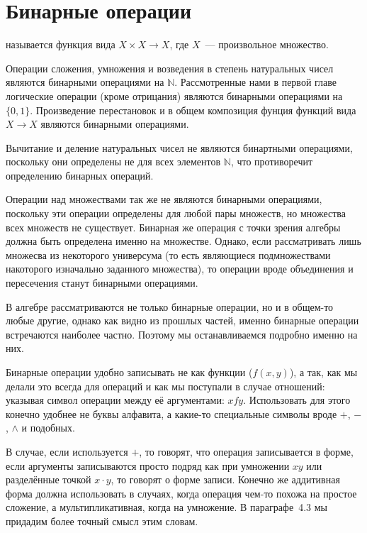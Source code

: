 \section{Бинарные операции}

\begin{definition}
 называется функция вида $X\times X\to X$, где $X$~--- произвольное множество. 
\end{definition}

\begin{example}
Операции сложения, умножения и возведения в степень натуральных чисел являются бинарными операциями на $\mathbb{N}$. Рассмотренные нами в первой главе логические операции (кроме отрицания) являются бинарными операциями на $\{0,1\}$. Произведение перестановок и в общем композиция фунция функций вида $X\to X$ являются бинарными операциями.
\end{example}

\begin{example}
Вычитание и деление натуральных чисел не являются бинартными операциями, поскольку они определены не для всех элементов $\mathbb{N}$, что противоречит определению бинарных операций.
\end{example}

\begin{example}
Операции над множествами так же не являются бинарными операциями, поскольку эти операции определены для любой пары множеств, но множества всех множеств не существует. Бинарная же операция с точки зрения алгебры должна быть определена именно на множестве. Однако, если рассматривать лишь множесва из некоторого универсума (то есть являющиеся подмножествами накоторого изначально заданного множества), то операции вроде объединения и пересечения станут бинарными операциями.
\end{example}

В алгебре рассматриваются не только бинарные операции, но и в общем-то любые другие, однако как видно из прошлых частей, именно бинарные операции встречаются наиболее частно. Поэтому мы останавливаемся подробно именно на них.

Бинарные операции удобно записывать не как функции ($f(x, y)$), а так, как мы делали это всегда для операций и как мы поступали в случае отношений: указывая символ операции между её аргументами: $xfy$. Использовать для этого конечно удобнее не буквы алфавита, а какие-то специальные символы вроде $+$, $-$, $\land$ и подобных.


В случае, если используется $+$, то говорят, что операция записывается в  форме, если аргументы записываются просто подряд как при умножении $xy$ или разделённые точкой $x\cdot y$, то говорят о  форме записи. Конечно же аддитивная форма должна использовать в случаях, когда операция чем-то похожа на простое сложение, а мультипликативная, когда на умножение. В параграфе~4.3 мы придадим более точный смысл этим словам.

